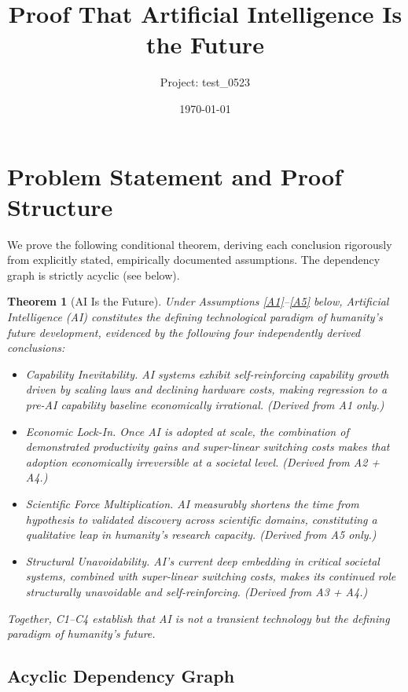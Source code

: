 \documentclass[12pt]{article}
\title{\textbf{Proof That Artificial Intelligence Is the Future}}
\author{Project: test\_0523}
\date{\today}
\newtheorem{theorem}{Theorem}
\begin{document}
\maketitle

\section*{Problem Statement and Proof Structure}

We prove the following conditional theorem, deriving each conclusion rigorously
from explicitly stated, empirically documented assumptions.  The dependency graph
is strictly acyclic (see below).

\begin{theorem}[AI Is the Future]\label{thm:main}
  Under Assumptions \ref{A1}--\ref{A5} below, Artificial Intelligence (AI)
  constitutes the defining technological paradigm of humanity's future
  development, evidenced by the following four independently derived conclusions:
  \begin{itemize}
    \item[(C1)] \emph{Capability Inevitability.}  AI systems exhibit
      self-reinforcing capability growth driven by scaling laws and declining
      hardware costs, making regression to a pre-AI capability baseline
      economically irrational.  (\emph{Derived from A1 only.})
    \item[(C2)] \emph{Economic Lock-In.}  Once AI is adopted at scale, the
      combination of demonstrated productivity gains and super-linear switching
      costs makes that adoption economically irreversible at a societal level.
      (\emph{Derived from A2 + A4.})
    \item[(C3)] \emph{Scientific Force Multiplication.}  AI measurably shortens
      the time from hypothesis to validated discovery across scientific domains,
      constituting a qualitative leap in humanity's research capacity.
      (\emph{Derived from A5 only.})
    \item[(C4)] \emph{Structural Unavoidability.}  AI's current deep embedding
      in critical societal systems, combined with super-linear switching costs,
      makes its continued role structurally unavoidable and self-reinforcing.
      (\emph{Derived from A3 + A4.})
  \end{itemize}
  Together, C1--C4 establish that AI is not a transient technology but the
  defining paradigm of humanity's future.
\end{theorem}

\subsection*{Acyclic Dependency Graph}
\end{document}
